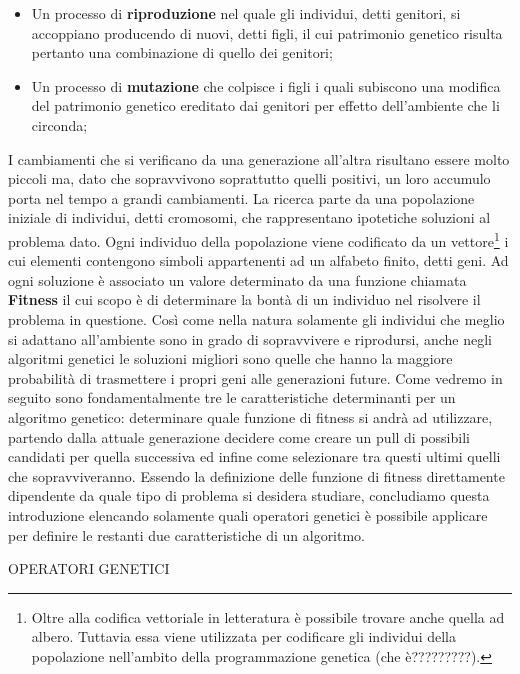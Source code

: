 \documentclass[11pt]{article}
\begin{document}
\begin{itemize}
    \item Un processo di \textbf{riproduzione} nel quale gli individui, detti genitori, si accoppiano producendo di nuovi, detti figli, il cui patrimonio genetico risulta pertanto una combinazione di quello dei genitori;
    \item Un processo di \textbf{mutazione} che colpisce i figli i quali subiscono una modifica del patrimonio genetico ereditato dai genitori per effetto dell'ambiente che li circonda;
\end{itemize}

I cambiamenti che si verificano da una generazione all'altra risultano essere molto piccoli ma, dato che sopravvivono soprattutto quelli positivi, un loro accumulo porta nel tempo a grandi cambiamenti.
La ricerca parte da una popolazione iniziale di individui, detti cromosomi, che rappresentano ipotetiche soluzioni al problema dato. Ogni individuo della popolazione viene codificato da un vettore\footnote{Oltre alla codifica vettoriale in letteratura è possibile trovare anche quella ad albero. Tuttavia essa viene utilizzata per codificare gli individui della popolazione nell'ambito della programmazione genetica (che è?????????).} i cui elementi contengono simboli appartenenti ad un alfabeto finito, detti geni. Ad ogni soluzione è associato un valore determinato da una funzione chiamata \textbf{Fitness} il cui scopo è di determinare la bontà di un individuo nel risolvere il problema in questione.
Così come nella natura solamente gli individui che meglio si adattano all’ambiente sono in grado di sopravvivere e riprodursi, anche negli algoritmi genetici le soluzioni migliori sono quelle che hanno la maggiore probabilità di trasmettere i propri geni alle generazioni future.
Come vedremo in seguito sono fondamentalmente tre le caratteristiche determinanti per un algoritmo genetico: determinare quale funzione di fitness si andrà ad utilizzare, partendo dalla attuale generazione decidere come creare un pull di possibili candidati per quella successiva ed infine come selezionare tra questi ultimi quelli che sopravviveranno.
Essendo la definizione delle funzione di fitness direttamente dipendente da quale tipo di problema si desidera studiare, concludiamo questa introduzione elencando solamente quali operatori genetici è possibile applicare per definire le restanti due caratteristiche di un algoritmo.


\vspace{2\baselineskip}
OPERATORI GENETICI
\vspace{2\baselineskip}
\end{document}
